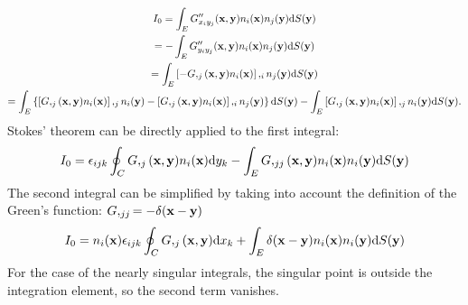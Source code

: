 \begin{multline}
	I_0
	= \int_E G''_{x_i y_j}({\bf x}, {\bf y}) n_i({\bf x}) n_j({\bf y}) \mathrm{d} S({\bf y}) \\
	= -\int_E G''_{y_i y_j}({\bf x}, {\bf y}) n_i({\bf x}) n_j({\bf y}) \mathrm{d} S({\bf y}) \\
	= \int_E \left[ -G,_j({\bf x}, {\bf y}) n_i({\bf x}) \right],_{i} n_j({\bf y}) \mathrm{d} S({\bf y}) \\
	= \int_E \left\{
		\left[G,_j({\bf x}, {\bf y}) n_i({\bf x}) \right],_{j} n_i({\bf y})
		-\left[G,_j({\bf x}, {\bf y}) n_i({\bf x}) \right],_{i} n_j({\bf y})
	\right\} \mathrm{d} S({\bf y})
	- \int_E \left[G,_j({\bf x}, {\bf y}) n_i({\bf x}) \right],_{j} n_i({\bf y}) \mathrm{d} S({\bf y}).
\end{multline}
%
Stokes' theorem can be directly applied to the first integral:
%
\begin{equation}
	I_0 = \epsilon_{ijk} \oint_C G,_j({\bf x}, {\bf y}) n_i({\bf x}) \mathrm{d} y_k
	- \int_E G,_{jj}({\bf x}, {\bf y}) n_i({\bf x}) n_i({\bf y}) \mathrm{d} S({\bf y})
\end{equation}
%
The second integral can be simplified by taking into account the definition of the Green's function: $G,_{jj} = -\delta({\bf x} - {\bf y})$
%
\begin{equation}
	I_0 = n_i({\bf x}) \epsilon_{ijk} \oint_C G,_j({\bf x}, {\bf y}) \mathrm{d} x_k
	+ \int_E \delta({\bf x} - {\bf y}) n_i({\bf x}) n_i({\bf y}) \mathrm{d} S({\bf y})
\end{equation}
%
For the case of the nearly singular integrals, the singular point is outside the integration element, so the second term vanishes.

